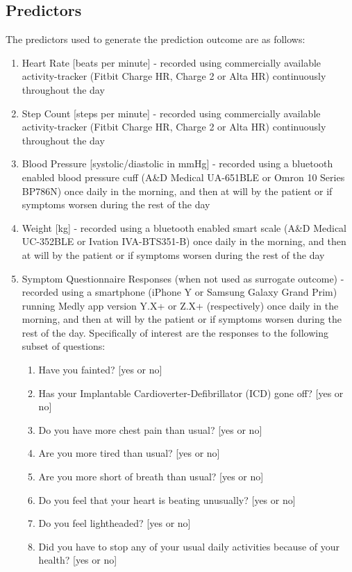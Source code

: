 \documentclass[]{article}
\begin{document}
\subsection{Predictors} %

The predictors used to generate the prediction outcome are as follows:
\begin{enumerate}
	\item Heart Rate [beats per minute] - recorded using commercially available activity-tracker (Fitbit Charge HR, Charge 2 or Alta HR) continuously throughout the day
	\item Step Count  [steps per minute] - recorded using commercially available activity-tracker (Fitbit Charge HR, Charge 2 or Alta HR) continuously throughout the day 
	\item Blood Pressure [systolic/diastolic in mmHg] - recorded using a bluetooth enabled blood pressure cuff (A\&D Medical UA-651BLE or Omron 10 Series BP786N) once daily in the morning, and then at will by the patient or if symptoms worsen during the rest of the day 
	\item Weight [kg] - recorded using a bluetooth enabled smart scale (A\&D Medical UC-352BLE or Ivation IVA-BTS351-B) once daily in the morning, and then at will by the patient or if symptoms worsen during the rest of the day 
	\item Symptom Questionnaire Responses (when not used as surrogate outcome) - recorded using a smartphone (iPhone Y or Samsung Galaxy Grand Prim) running Medly app version Y.X+ or Z.X+ (respectively) once daily in the morning, and then at will by the patient or if symptoms worsen during the rest of the day. Specifically of interest are the responses to the following subset of questions:
		\begin{enumerate}
			\item Have you fainted? [yes or no]
			\item Has your Implantable Cardioverter-Defibrillator (ICD) gone off? [yes or no]
			\item Do you have more chest pain than usual? [yes or no]
			\item Are you more tired than usual? [yes or no]
			\item Are you more short of breath than usual? [yes or no]
			\item Do you feel that your heart is beating unusually? [yes or no]
			\item Do you feel lightheaded? [yes or no]
			\item Did you have to stop any of your usual daily activities because of your health? [yes or no]

\end{enumerate}
\end{enumerate}
\end{document}
